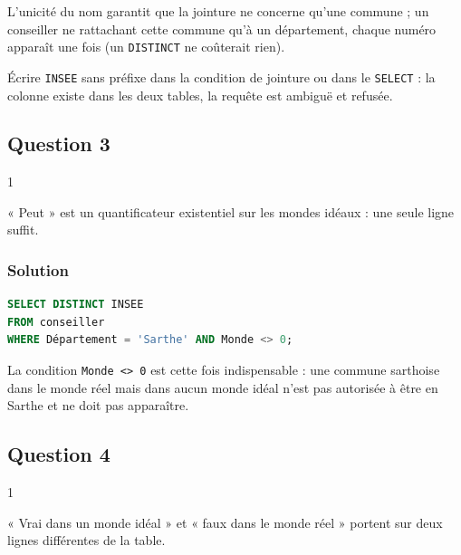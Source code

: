 \documentclass[11pt,a4paper]{article}
\begin{document}
L'unicité du nom garantit que la jointure ne concerne qu'une commune ; un conseiller ne rattachant cette commune qu'à un département, chaque numéro apparaît une fois (un \texttt{DISTINCT} ne coûterait rien).

\begin{piege}

Écrire \texttt{INSEE} sans préfixe dans la condition de jointure ou dans le \texttt{SELECT} : la colonne existe dans les deux tables, la requête est ambiguë et refusée.

\end{piege}

\hypertarget{question-3}{%
\subsection{Question 3}\label{question-3}}

\begin{indication}{1}

« Peut » est un quantificateur existentiel sur les mondes idéaux : une seule ligne suffit.

\end{indication}

\hypertarget{solution-2}{%
\subsubsection{Solution}\label{solution-2}}

\begin{lstlisting}[language=SQL]
SELECT DISTINCT INSEE
FROM conseiller
WHERE Département = 'Sarthe' AND Monde <> 0;
\end{lstlisting}

La condition \texttt{Monde\ \textless{}\textgreater{}\ 0} est cette fois indispensable : une commune sarthoise dans le monde réel mais dans aucun monde idéal n'est pas autorisée à être en Sarthe et ne doit pas apparaître.

\hypertarget{question-4}{%
\subsection{Question 4}\label{question-4}}

\begin{indication}{1}

« Vrai dans un monde idéal » et « faux dans le monde réel » portent sur deux lignes différentes de la table.

\end{indication}
\end{document}

